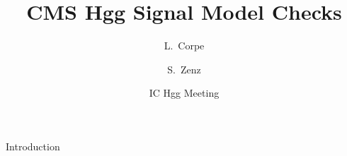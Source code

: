 \documentclass{beamer}
\title{CMS Hgg Signal Model Checks}
\author{L.~Corpe\inst{1} \and S.~Zenz\inst{1}}
\institute[Imperial College London] %
{
  \inst{1}%
    Department of Physics\\
}
\date{IC Hgg Meeting }
\begin{document}
\begin{frame}
\titlepage
\end{frame}

\begin{frame}{Introduction}

\end{frame}
\end{document}
